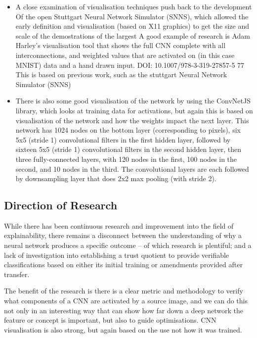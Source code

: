 \begin{itemize}
    \item A close examination of visualisation techniques push back to the development Of the open Stuttgart Neural Network Simulator (SNNS), which allowed the early definition and visualisation (based on X11 graphics) to get the size and scale of the demostrations of the largest A good example of research is Adam Harley's visualisation tool \cite{li_visualizing_2018} that shows the full CNN complete with all interconnections, and weighted values that are activated on (in this case MNIST) data and a hand drawn input. DOI: 10.1007/978-3-319-27857-5 77  This is based on previous work, such as the stuttgart Neural Network Simulator (SNNS) 
    \item There is also some good visualisation of the network by using the ConvNetJS library, which looks at training data for activations, but again this is based on visualisation of the network and how the weights impact the next layer. This network has 1024 nodes on the bottom layer (corresponding to pixels), six 5x5 (stride 1) convolutional filters in the first hidden layer, followed by sixteen 5x5 (stride 1) convolutional filters in the second hidden layer, then three fully-connected layers, with 120 nodes in the first, 100 nodes in the second, and 10 nodes in the third. The convolutional layers are each followed by downsampling layer that does 2x2 max pooling (with stride 2). 
\end{itemize}


\subsection{Direction of Research}
While there has been continuous research and improvement into the field of explainability, there remains a disconnect between the understanding of why a neural network produces a specific outcome – of which research is plentiful; and a lack of investigation into establishing a trust quotient to provide verifiable classifications based on either its initial training or amendments provided after transfer.

The benefit of the research is there is a clear metric and methodology to verify what components of a CNN are activated by a source image, and we can do this not only in an interesting way that can show how far down a deep network the feature or concept is important, but also to guide optimisations. CNN visualisation is also strong, but again based on the use not how it was trained.

